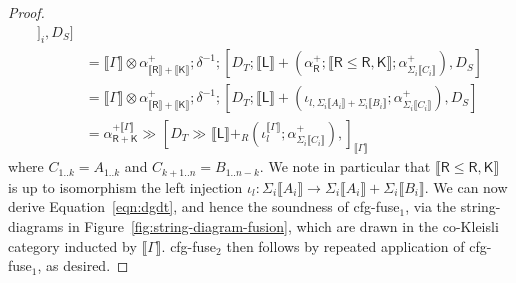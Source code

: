 \documentclass[acmsmall,screen,review]{acmart}
\newcommand{\ms}[1]{\ensuremath{\mathsf{#1}}}
\newcommand{\brle}[1]{{\textsf{#1}}}
\newcommand{\dnt}[1]{\llbracket{#1}\rrbracket}
\newcommand{\rseq}[3]{#2 \gg_{#1} #3}
\newcommand{\envcop}[3]{[#2, #3]_{#1}}
\begin{document}
\begin{proof}
\begin{equation}
\begin{aligned}
        ]_i,
        D_S
      ] \\
      & = \dnt{\Gamma} \otimes \alpha^+_{\dnt{\ms{R}} + \dnt{\ms{K}}} ; \delta^{-1} ; [
        D_T ; \dnt{\ms{L}} 
          + (\alpha^+_{\ms{R}} ; \dnt{\ms{R} \leq \ms{R, K}} ; \alpha^+_{\Sigma_i\dnt{C_i}}),
        D_S
      ] \\
      & = \dnt{\Gamma} \otimes \alpha^+_{\dnt{\ms{R}} + \dnt{\ms{K}}} ; \delta^{-1} ; [
        D_T ; \dnt{\ms{L}} 
          + (\iota_{l, \Sigma_i\dnt{A_i} + \Sigma_i\dnt{B_i}} ; \alpha^+_{\Sigma_i\dnt{C_i}}),
        D_S
      ] \\
      & = \rseq{}{\alpha^{+\dnt{\Gamma}}_{\ms{R} + \ms{K}}}{\envcop{\dnt{\Gamma}}
        {\rseq{}{D_T}{\dnt{\ms{L}} +_R (\iota_l^{\dnt{\Gamma}} ; \alpha^+_{\Sigma_i\dnt{C_i}})}}
        {}}
    \end{aligned}
    \label{eqn:dg-rhs}
  \end{equation}
  where $C_{1..k} = A_{1..k}$ and $C_{k+1..n} = B_{1..n-k}$. We note in particular that $\dnt{\ms{R}
  \leq \ms{R, K}}$ is up to isomorphism the left injection $\iota_l : \Sigma_i\dnt{A_i} \to
  \Sigma_i\dnt{A_i} + \Sigma_i\dnt{B_i}$. We can now derive Equation~\ref{eqn:dgdt}, and hence the
  soundness of \brle{cfg-fuse$_1$}, via the string-diagrams in
  Figure~\ref{fig:string-diagram-fusion}, which are drawn in the co-Kleisli category inducted by
  $\dnt{\Gamma}$. \brle{cfg-fuse$_2$} then follows by repeated application of \brle{cfg-fuse$_1$}, as
  desired.
\end{proof}
\end{document}
